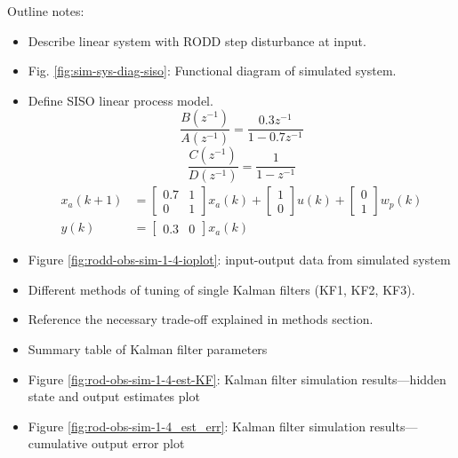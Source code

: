 Outline notes:
\begin{itemize}
	\item Describe linear system with RODD step disturbance at input.
	\item Fig. \ref{fig:sim-sys-diag-siso}: Functional diagram of simulated system.
	\item Define SISO linear process model.
\begin{equation}
	\frac{B(z^{-1})}{A(z^{-1})} = \frac{0.3z^{-1}}{1-0.7z^{-1}}
\end{equation}
\begin{equation}
	\frac{C(z^{-1})}{D(z^{-1})} = \frac{1}{1-z^{-1}}
\end{equation}
\begin{equation}
	\begin{split}
	x_{a}(k+1) & =\left[\begin{array}{cc}
		0.7 & 1 \\
		0 & 1
	\end{array}\right] x_{a}(k)+\left[\begin{array}{l}
		1 \\
		0
	\end{array}\right] u(k)+\left[\begin{array}{l}
		0 \\
		1
	\end{array}\right] w_{p}(k) \\
	y(k) & =\left[\begin{array}{cc}
	0.3 & 0
\end{array}\right] x_{a}(k)
\end{split}
\end{equation}
	\item Figure \ref{fig:rodd-obs-sim-1-4-ioplot}: input-output data from simulated system
	\item Different methods of tuning of single Kalman filters (KF1, KF2, KF3).
	\item Reference the necessary trade-off explained in methods section.
	\item Summary table of Kalman filter parameters
	\item Figure \ref{fig:rod-obs-sim-1-4-est-KF}: Kalman filter simulation results—hidden state and output estimates plot
	\item Figure \ref{fig:rod-obs-sim-1-4_est_err}: Kalman filter simulation results—cumulative output error plot
\end{itemize}

